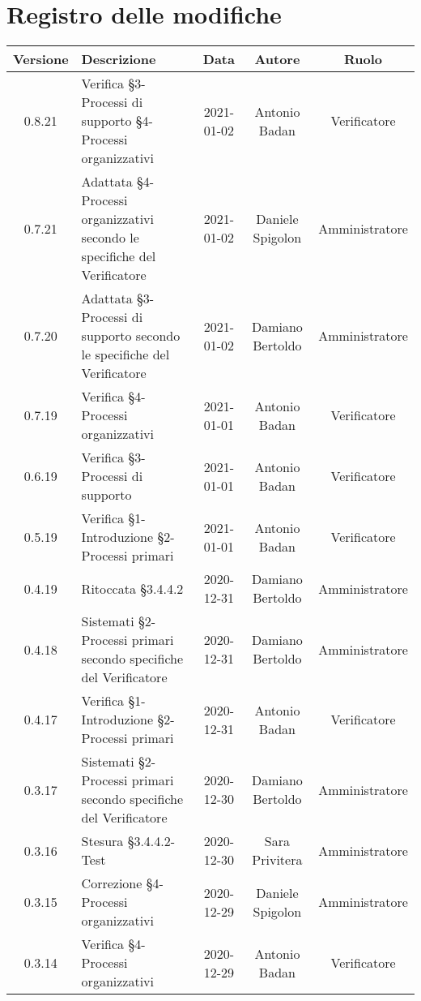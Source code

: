 \section*{Registro delle modifiche}

\begin{center}
	\begin{longtable}{|c|p{5cm}|c|c|c|}
	\hline
	\rowcolor{lighter-grayer}
	\textbf{Versione} & \textbf{Descrizione} & \textbf{Data} & \textbf{Autore} & \textbf{Ruolo} \\
	\hline
	\endfirsthead

	0.8.21 & Verifica §3-Processi di supporto §4-Processi organizzativi  & 2021-01-02 & Antonio Badan & Verificatore \\
	\hline
	0.7.21 & Adattata §4-Processi organizzativi secondo le specifiche del Verificatore & 2021-01-02 & Daniele Spigolon & Amministratore \\
	\hline
	0.7.20 & Adattata §3-Processi di supporto secondo le specifiche del Verificatore & 2021-01-02 & Damiano Bertoldo & Amministratore \\
	\hline
	0.7.19 & Verifica §4-Processi organizzativi & 2021-01-01 & Antonio Badan & Verificatore \\
	\hline
	0.6.19 & Verifica §3-Processi di supporto & 2021-01-01 & Antonio Badan & Verificatore \\
	\hline
	0.5.19 & Verifica §1-Introduzione §2-Processi primari & 2021-01-01 & Antonio Badan & Verificatore \\
	\hline
	0.4.19 & Ritoccata §3.4.4.2 & 2020-12-31 & Damiano Bertoldo & Amministratore \\
	\hline
	0.4.18 & Sistemati §2-Processi primari secondo specifiche del Verificatore & 2020-12-31 & Damiano Bertoldo & Amministratore \\
	\hline
	0.4.17 & Verifica §1-Introduzione §2-Processi primari & 2020-12-31 & Antonio Badan & Verificatore \\
	\hline
	0.3.17 & Sistemati §2-Processi primari secondo specifiche del Verificatore  & 2020-12-30 & Damiano Bertoldo & Amministratore \\
	\hline
	0.3.16 & Stesura §3.4.4.2-Test  & 2020-12-30 & Sara Privitera & Amministratore \\
	\hline
	0.3.15 & Correzione §4-Processi organizzativi  & 2020-12-29 & Daniele Spigolon & Amministratore \\
	\hline
	0.3.14 & Verifica §4-Processi organizzativi  & 2020-12-29 & Antonio Badan & Verificatore \\

\end{longtable}
\end{center}
